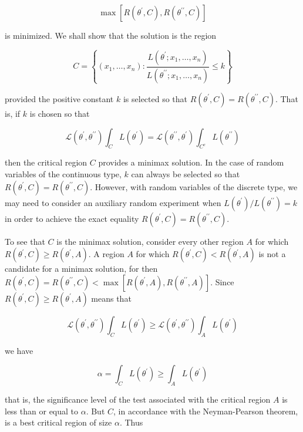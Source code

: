 $$
\max \left[R\left(\theta^{\prime}, C\right), R\left(\theta^{\prime \prime}, C\right)\right]
$$

is minimized. We shall show that the solution is the region

$$
C=\left\{\left(x_{1}, \ldots, x_{n}\right): \frac{L\left(\theta^{\prime} ; x_{1}, \ldots, x_{n}\right)}{L\left(\theta^{\prime \prime} ; x_{1}, \ldots, x_{n}\right)} \leq k\right\}
$$

provided the positive constant $k$ is selected so that $R\left(\theta^{\prime}, C\right)=R\left(\theta^{\prime \prime}, C\right)$. That is, if $k$ is chosen so that

$$
\mathcal{L}\left(\theta^{\prime}, \theta^{\prime \prime}\right) \int_{C} L\left(\theta^{\prime}\right)=\mathcal{L}\left(\theta^{\prime \prime}, \theta^{\prime}\right) \int_{C^{c}} L\left(\theta^{\prime \prime}\right)
$$

then the critical region $C$ provides a minimax solution. In the case of random variables of the continuous type, $k$ can always be selected so that $R\left(\theta^{\prime}, C\right)=R\left(\theta^{\prime \prime}, C\right)$. However, with random variables of the discrete type, we may need to consider an auxiliary random experiment when $L\left(\theta^{\prime}\right) / L\left(\theta^{\prime \prime}\right)=k$ in order to achieve the exact equality $R\left(\theta^{\prime}, C\right)=R\left(\theta^{\prime \prime}, C\right)$.

To see that $C$ is the minimax solution, consider every other region $A$ for which $R\left(\theta^{\prime}, C\right) \geq R\left(\theta^{\prime}, A\right)$. A region $A$ for which $R\left(\theta^{\prime}, C\right)<R\left(\theta^{\prime}, A\right)$ is not a candidate for a minimax solution, for then $R\left(\theta^{\prime}, C\right)=R\left(\theta^{\prime \prime}, C\right)<\max \left[R\left(\theta^{\prime}, A\right), R\left(\theta^{\prime \prime}, A\right)\right]$. Since $R\left(\theta^{\prime}, C\right) \geq R\left(\theta^{\prime}, A\right)$ means that

$$
\mathcal{L}\left(\theta^{\prime}, \theta^{\prime \prime}\right) \int_{C} L\left(\theta^{\prime}\right) \geq \mathcal{L}\left(\theta^{\prime}, \theta^{\prime \prime}\right) \int_{A} L\left(\theta^{\prime}\right)
$$

we have

$$
\alpha=\int_{C} L\left(\theta^{\prime}\right) \geq \int_{A} L\left(\theta^{\prime}\right)
$$

that is, the significance level of the test associated with the critical region $A$ is less than or equal to $\alpha$. But $C$, in accordance with the Neyman-Pearson theorem, is a best critical region of size $\alpha$. Thus

